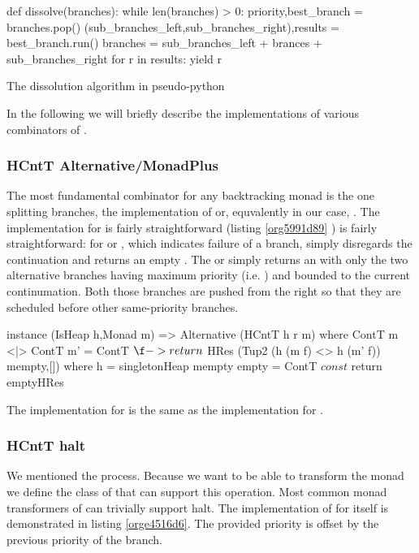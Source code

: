\begin{code}
\begin{pycode}
def dissolve(branches):
    while len(branches) > 0:
        priority,best_branch = branches.pop()
        (sub_branches_left,sub_branches_right),results = best_branch.run()
        branches = sub_branches_left + brances + sub_branches_right
        for r in results:
            yield r
\end{pycode}
\caption{\label{orgd9e01bb}The dissolution algorithm in pseudo-python}
\end{code}


In the following we will briefly describe the implementations of
various combinators of .

\subsubsection{HCntT Alternative/MonadPlus}
\label{sec:orgdfb6e7c}
The most fundamental combinator for any backtracking monad is the one
splitting branches, the implementation of  or,
equvalently in our case, . The implementation for 
is fairly straightforward (listing \ref{org5991d89} ) is fairly
straightforward: for  or , which indicates failure of a
branch, simply disregards the continuation and returns an empty
. The  or \hask{<|>} simply returns an  with only the
two alternative branches having maximum priority (i.e. ) and bounded to the current continumation. Both those
branches are pushed from the right so that they are scheduled before
other same-priority branches.

\begin{code}
\begin{haskellcode}
instance (IsHeap h,Monad m) => Alternative (HCntT h r m) where
  ContT m <|> ContT m' = ContT $ \f -> return
    $ HRes (Tup2 (h (m f) <> h (m' f)) mempty,[])
    where
      h = singletonHeap mempty
  empty = ContT $ const $ return emptyHRes
\end{haskellcode}
\caption{\label{org5991d89}The implementation for  is the same as the implementation for .}
\end{code}


\subsubsection{HCntT halt}
\label{sec:org16bc12a}
We mentioned the   process. Because we want to be able to
transform the  monad we define the class of  that
can support this operation. Most common monad transformers of 
can trivially support halt. The implementation of  for 
itself is demonstrated in listing \ref{orge4516d6}. The provided
priority is offset by the previous priority of the branch.


